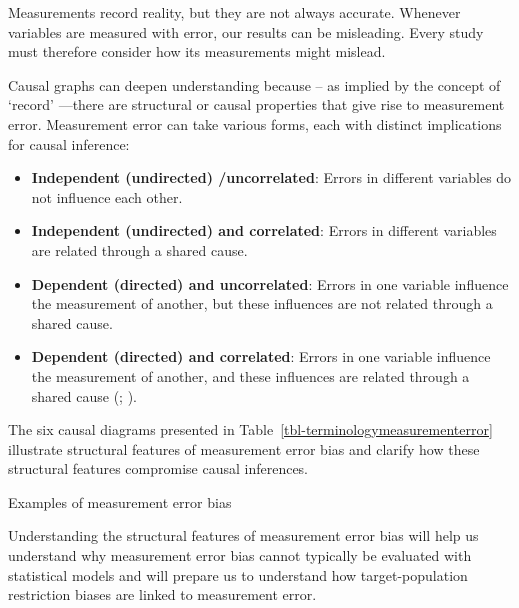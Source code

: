 \documentclass[
  single column]{article}
\providecommand{\tightlist}{%
  \setlength{\itemsep}{0pt}\setlength{\parskip}{0pt}}\usepackage{longtable,booktabs,array}
\begin{document}
Measurements record reality, but they are not always accurate. Whenever
variables are measured with error, our results can be misleading. Every
study must therefore consider how its measurements might mislead.

Causal graphs can deepen understanding because -- as implied by the
concept of `record' ---there are structural or causal properties that
give rise to measurement error. Measurement error can take various
forms, each with distinct implications for causal inference:

\begin{itemize}
\tightlist
\item
  \textbf{Independent (undirected) /uncorrelated}: Errors in different
  variables do not influence each other.
\item
  \textbf{Independent (undirected) and correlated}: Errors in different
  variables are related through a shared cause.
\item
  \textbf{Dependent (directed) and uncorrelated}: Errors in one variable
  influence the measurement of another, but these influences are not
  related through a shared cause.
\item
  \textbf{Dependent (directed) and correlated}: Errors in one variable
  influence the measurement of another, and these influences are related
  through a shared cause (; ).
\end{itemize}

The six causal diagrams presented in
Table~\ref{tbl-terminologymeasurementerror} illustrate structural
features of measurement error bias and clarify how these structural
features compromise causal inferences.

\begin{table}

\caption{\label{tbl-terminologymeasurementerror}Examples of measurement
error bias}

\centering{

\terminologymeasurementerror

}

\end{table}%

Understanding the structural features of measurement error bias will
help us understand why measurement error bias cannot typically be
evaluated with statistical models and will prepare us to understand how
target-population restriction biases are linked to measurement error.
\end{document}
